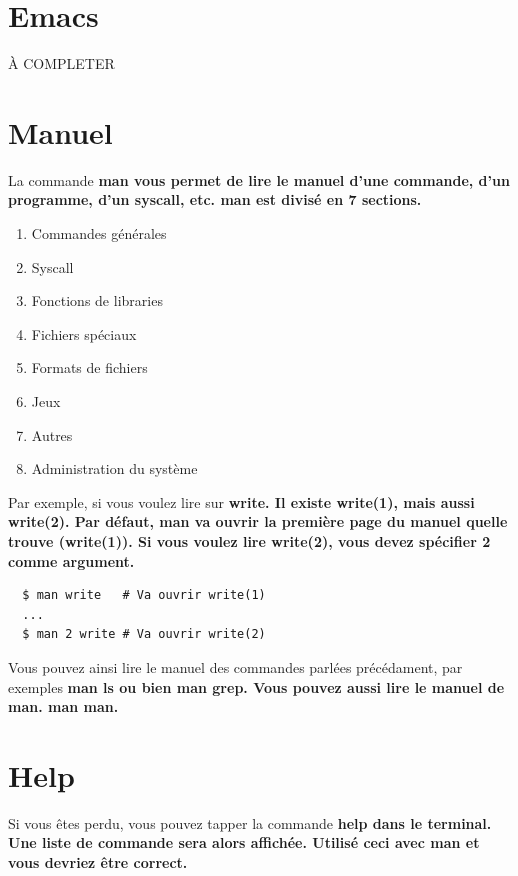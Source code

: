 \documentclass[12pt,oneside,final]{article}
\begin{document}
\section{Emacs}
À COMPLETER


\newpage
\section{Manuel}
La commande \bf{man} vous permet de lire le manuel d'une commande,
d'un programme, d'un syscall, etc. \bf{man} est divisé en 7 sections.

\begin{enumerate}[1]
\item Commandes générales
\item Syscall
\item Fonctions de libraries
\item Fichiers spéciaux
\item Formats de fichiers
\item Jeux
\item Autres
\item Administration du système
\end{enumerate}

Par exemple, si vous voulez lire sur \bf{write}. Il existe
\bf{write(1)}, mais aussi \bf{write(2)}. Par défaut, \bf{man} va
ouvrir la première page du manuel quelle trouve (\bf{write(1)}). Si
vous voulez lire \bf{write(2)}, vous devez spécifier 2 comme argument.

\begin{verbatim}
  $ man write   # Va ouvrir write(1)
  ...
  $ man 2 write # Va ouvrir write(2)
\end{verbatim}

Vous pouvez ainsi lire le manuel des commandes parlées précédament,
par exemples \bf{man ls} ou bien \bf{man grep}. Vous pouvez aussi lire
le manuel de \bf{man}. \bf{man man}.


\section{Help}
Si vous êtes perdu, vous pouvez tapper la commande \bf{help} dans le
terminal. Une liste de commande sera alors affichée. Utilisé ceci avec
\bf{man} et vous devriez être correct.
\end{document}
